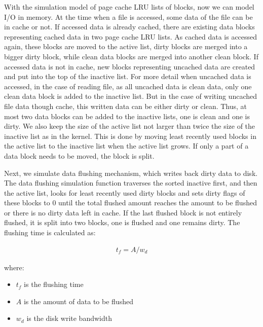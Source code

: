 \documentclass[conference]{IEEEtran}
\begin{document}
			With the simulation model of page cache LRU lists of blocks, now we can 
			model I/O in memory.
			At the time when a file is accessed, some data of the file can be in 
			cache or not. 
			If accessed data is already cached, there are existing data blocks 
			representing cached data in two page cache LRU lists. 
			As cached data is accessed again, these blocks are moved to 
			the active list, dirty blocks are merged into a bigger dirty block, 
			while clean data blocks are merged into another clean block. 
			If accessed data is not in cache, new blocks representing uncached data 
			are created and put into the top of the inactive list. 
			For more detail when uncached data is accessed, in the case of 
			reading file, as all uncached data is clean data, only one clean data 
			block is added to the inactive list.
			But in the case of writing uncached file data though cache, 
			this written data can be either dirty or clean. 
			Thus, at most two data blocks can be added to the inactive lists, 
			one is clean and one is dirty. 
			We also keep the size of the active list not larger than twice the size of 
			the inactive list as in the kernel. This is done by moving least recently 
			used blocks in the active list to the inactive list when the active list 
			grows. If only a part of a data block needs to be moved, 
			the block is split.

			Next, we simulate data flushing mechanism, which writes back 
			dirty data to disk. 
			The data flushing simulation function traverses the sorted inactive first, 
			and then the active list, looks for least recently used dirty blocks and 
			sets dirty flags of these blocks to 0 until the total flushed amount 
			reaches the amount to be flushed or there is no dirty data left in cache. 
			If the last flushed block is not entirely flushed, it is split into 
			two blocks, one is flushed and one remains dirty.
			The flushing time is calculated as:
					
			\begin{align*}
				t_f = A / w_d
			\end{align*}		
			
			where:
			\begin{itemize}
				\item $t_f$ is the flushing time
				\item $A$ is the amount of data to be flushed
				\item $w_d$ is the disk write bandwidth
			\end{itemize}		
			
\end{document}

